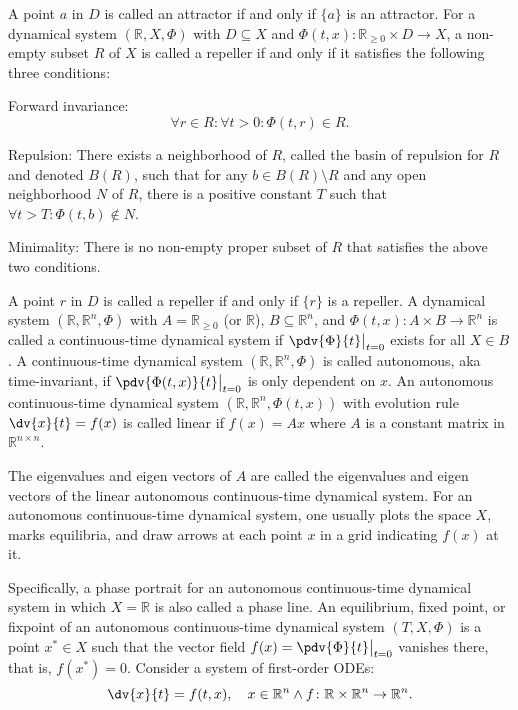 \documentclass[a4paper,12pt]{report}
\begin{document}
A point $a$ in $D$ is called an attractor if and only if $\{a\}$ is an attractor.
For a dynamical system $(\mathbb{R}, X, \Phi)$ with $D\subseteq X$ and $\Phi(t,x)\colon \mathbb{R}_{\geq 0}\times D\to X$, a non-empty subset $R$ of $X$ is called a repeller if and only if it satisfies the following three conditions:
\bit
\item Forward invariance:
    \[\forall r\in R\colon\forall t>0\colon\Phi(t,r)\in R.\]
\item Repulsion: There exists a neighborhood of $R$, called the basin of repulsion for $R$ and denoted $B(R)$, such that for any $b\in B(R)\setminus R$ and any open neighborhood $N$ of $R$, there is a positive constant $T$ such that $\forall t>T\colon\Phi(t,b)\notin N$.
\item Minimality: There is no non-empty proper subset of $R$ that satisfies the above two conditions.
\eit

A point $r$ in $D$ is called a repeller if and only if $\{r\}$ is a repeller.
A dynamical system $(\mathbb{R}, \mathbb{R}^n, \Phi)$ with $A=\mathbb{R}_{\geq 0}$ (or $\mathbb{R}$), $B\subseteq\mathbb{R}^n$, and $\Phi(t,x)\colon A\times B\to\mathbb{R}^n$ is called a continuous-time dynamical system if $\pdv{\Phi}{t}\big\vert_{t=0}$ exists for all $X\in B$.
A continuous-time dynamical system $(\mathbb{R}, \mathbb{R}^n, \Phi)$ is called autonomous, aka time-invariant, if $\pdv{\Phi(t,x)}{t}\big\vert_{t=0}$ is only dependent on $x$.
An autonomous continuous-time dynamical system $(\mathbb{R}, \mathbb{R}^n, \Phi(t,x))$ with evolution rule $\dv{x}{t}=f(x)$ is called linear if $f(x)=Ax$ where $A$ is a constant matrix in $\mathbb{R}^{n\times n}$.

The eigenvalues and eigen vectors of $A$ are called the eigenvalues and eigen vectors of the linear autonomous continuous-time dynamical system.
For an autonomous continuous-time dynamical system, one usually plots the space $X$, marks equilibria, and draw arrows at each point $x$ in a grid indicating $f(x)$ at it.

Specifically, a phase portrait for an autonomous continuous-time dynamical system in which $X=\mathbb{R}$ is also called a phase line.
An equilibrium, fixed point, or fixpoint of an autonomous continuous-time dynamical system $(T, X, \Phi)$ is a point $x^*\in X$ such that the vector field $f(x)=\pdv{\Phi}{t}\big\vert_{t=0}$ vanishes there, that is, $f(x^*)=0$.
Consider a system of first-order ODEs:
\[\dv{x}{t}=f(t,x), \quad x\in\mathbb{R}^n\land f\colon\mathbb{R}\times\mathbb{R}^n\to\mathbb{R}^n.\]
\end{document}
